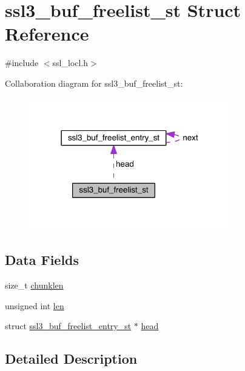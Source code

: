 \hypertarget{structssl3__buf__freelist__st}{}\section{ssl3\+\_\+buf\+\_\+freelist\+\_\+st Struct Reference}
\label{structssl3__buf__freelist__st}


{\ttfamily \#include $<$ssl\+\_\+locl.\+h$>$}



Collaboration diagram for ssl3\+\_\+buf\+\_\+freelist\+\_\+st\+:\nopagebreak
\begin{figure}[H]
\begin{center}
\leavevmode
\includegraphics[width=249pt]{structssl3__buf__freelist__st__coll__graph}
\end{center}
\end{figure}
\subsection*{Data Fields}
\begin{DoxyCompactItemize}
\item 
size\+\_\+t \hyperlink{structssl3__buf__freelist__st_af003d62de43bc626a7449370fb56b21a}{chunklen}
\item 
unsigned int \hyperlink{structssl3__buf__freelist__st_a77124bd5f7e31e6fffc19f335da0c23f}{len}
\item 
struct \hyperlink{structssl3__buf__freelist__entry__st}{ssl3\+\_\+buf\+\_\+freelist\+\_\+entry\+\_\+st} $\ast$ \hyperlink{structssl3__buf__freelist__st_aa438b9a4f3360d6a51ff073e584f1809}{head}
\end{DoxyCompactItemize}


\subsection{Detailed Description}


